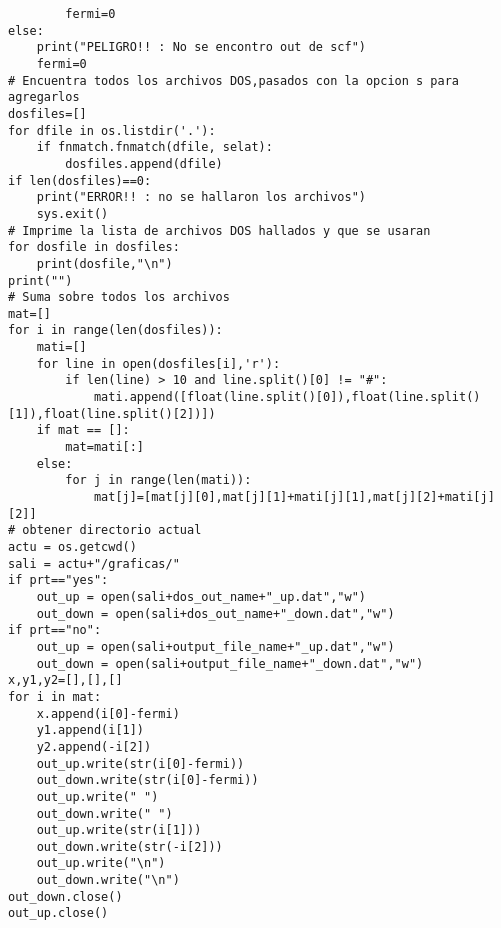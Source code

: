 \begin{lstlisting}
        fermi=0
else:
    print("PELIGRO!! : No se encontro out de scf")
    fermi=0
# Encuentra todos los archivos DOS,pasados con la opcion s para agregarlos
dosfiles=[]
for dfile in os.listdir('.'):
    if fnmatch.fnmatch(dfile, selat):
        dosfiles.append(dfile)
if len(dosfiles)==0:
    print("ERROR!! : no se hallaron los archivos")
    sys.exit()
# Imprime la lista de archivos DOS hallados y que se usaran
for dosfile in dosfiles:
    print(dosfile,"\n")
print("")
# Suma sobre todos los archivos
mat=[]
for i in range(len(dosfiles)):
    mati=[]
    for line in open(dosfiles[i],'r'):
        if len(line) > 10 and line.split()[0] != "#":
            mati.append([float(line.split()[0]),float(line.split()[1]),float(line.split()[2])])
    if mat == []:
        mat=mati[:]
    else:
        for j in range(len(mati)):
            mat[j]=[mat[j][0],mat[j][1]+mati[j][1],mat[j][2]+mati[j][2]]
# obtener directorio actual
actu = os.getcwd()
sali = actu+"/graficas/"
if prt=="yes":
    out_up = open(sali+dos_out_name+"_up.dat","w")
    out_down = open(sali+dos_out_name+"_down.dat","w")
if prt=="no":
    out_up = open(sali+output_file_name+"_up.dat","w")
    out_down = open(sali+output_file_name+"_down.dat","w")
x,y1,y2=[],[],[]
for i in mat:
    x.append(i[0]-fermi)
    y1.append(i[1])
    y2.append(-i[2])
    out_up.write(str(i[0]-fermi))
    out_down.write(str(i[0]-fermi))
    out_up.write(" ")
    out_down.write(" ")
    out_up.write(str(i[1]))
    out_down.write(str(-i[2]))
    out_up.write("\n")
    out_down.write("\n")
out_down.close()
out_up.close()
\end{lstlisting}